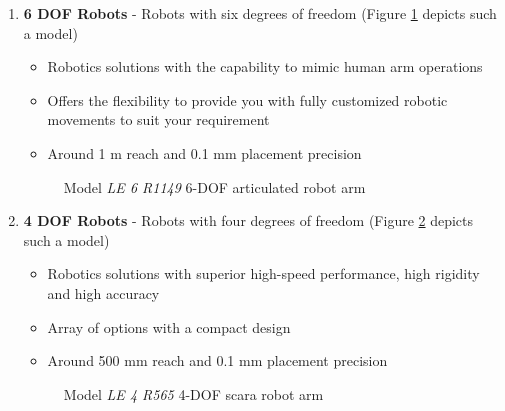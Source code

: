 \documentclass[a4paper,12pt]{report}
\begin{document}
\begin{enumerate}
	\item \textbf{6 DOF Robots} - Robots with six degrees of freedom (Figure \ref{fig:sixdofrobot} depicts such a model)
	\begin{itemize}
		\item Robotics solutions with the capability to mimic human arm operations
		\item Offers the flexibility to provide you with fully customized robotic movements to suit your requirement
		\item  Around 1 m reach and 0.1 mm placement precision
	\end{itemize}
	
	\begin{figure}[h]
		\centering
		\caption{Model \textit{LE 6 R1149} 6-DOF articulated robot arm\cite{articlulated_robots}}
		\label{fig:sixdofrobot}
	\end{figure}
	
	
	
	\item\textbf{ 4 DOF Robots} - Robots with four degrees of freedom (Figure \ref{fig:fourdofrobot} depicts such a model)
	\begin{itemize}
		\item Robotics solutions with superior high-speed performance, high rigidity and high accuracy
		\item Array of options with a compact design
		\item Around 500 mm reach and 0.1 mm placement precision
	\end{itemize}

	\begin{figure}[h]
		\centering
		\caption{Model \textit{LE 4 R565} 4-DOF \ac{scara} robot arm\cite{scara_robots}}
		\label{fig:fourdofrobot}
	\end{figure}
	

\end{enumerate}
\end{document}
